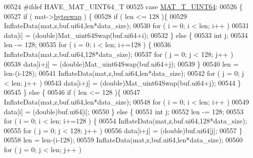 \begin{DoxyCode}
00524 \textcolor{preprocessor}{#ifdef HAVE\_MAT\_UINT64\_T}
00525         \textcolor{keywordflow}{case} \hyperlink{group___m_a_t_ggacf7b3b879282b7ab3a51190e49bf3453a45547932c46be27118abe08302d7e29f}{MAT\_T\_UINT64}:
00526         \{
00527             \textcolor{keywordflow}{if} ( mat->\hyperlink{struct__mat__t_a99d207977af5e04941ace56d71817a40}{byteswap} ) \{
00528                 \textcolor{keywordflow}{if} ( len <= 128 )\{
00529                     InflateData(mat,z,buf.ui64,len*data\_size);
00530                     \textcolor{keywordflow}{for} ( i = 0; i < len; i++ )
00531                         data[i] = (\textcolor{keywordtype}{double})Mat\_uint64Swap(buf.ui64+i);
00532                 \} \textcolor{keywordflow}{else} \{
00533                     \textcolor{keywordtype}{int} j;
00534                     len -= 128;
00535                     \textcolor{keywordflow}{for} ( i = 0; i < len; i+=128 ) \{
00536                         InflateData(mat,z,buf.ui64,128*data\_size);
00537                         \textcolor{keywordflow}{for} ( j = 0; j < 128; j++ )
00538                             data[i+j] = (\textcolor{keywordtype}{double})Mat\_uint64Swap(buf.ui64+j);
00539                     \}
00540                     len = len-(i-128);
00541                     InflateData(mat,z,buf.ui64,len*data\_size);
00542                     \textcolor{keywordflow}{for} ( j = 0; j < len; j++ )
00543                         data[i+j] = (\textcolor{keywordtype}{double})Mat\_uint64Swap(buf.ui64+j);
00544                 \}
00545             \} \textcolor{keywordflow}{else} \{
00546                 \textcolor{keywordflow}{if} ( len <= 128 )\{
00547                     InflateData(mat,z,buf.ui64,len*data\_size);
00548                     \textcolor{keywordflow}{for} ( i = 0; i < len; i++ )
00549                         data[i] = (\textcolor{keywordtype}{double})buf.ui64[i];
00550                 \} \textcolor{keywordflow}{else} \{
00551                     \textcolor{keywordtype}{int} j;
00552                     len -= 128;
00553                     \textcolor{keywordflow}{for} ( i = 0; i < len; i+=128 ) \{
00554                         InflateData(mat,z,buf.ui64,128*data\_size);
00555                         \textcolor{keywordflow}{for} ( j = 0; j < 128; j++ )
00556                             data[i+j] = (\textcolor{keywordtype}{double})buf.ui64[j];
00557                     \}
00558                     len = len-(i-128);
00559                     InflateData(mat,z,buf.ui64,len*data\_size);
00560                     \textcolor{keywordflow}{for} ( j = 0; j < len; j++ )

\end{DoxyCode}
